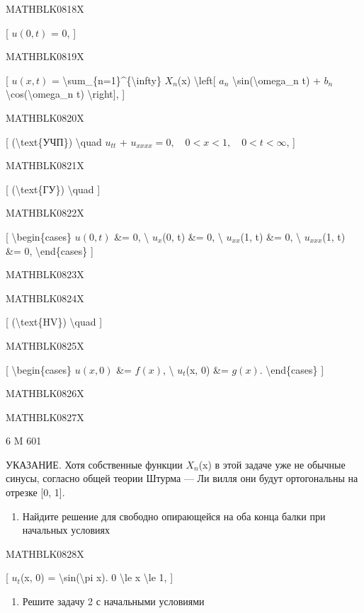 \documentclass[
]{article}
\providecommand{\tightlist}{%
  \setlength{\itemsep}{0pt}\setlength{\parskip}{0pt}}
\begin{document}
{{MATHBLK0818X

{[} \(u(0, t)\) = 0, {]}

MATHBLK0819X

{[} \(u(x, t)\) =
\textbackslash sum\_\{n=1\}\^{}\{\textbackslash infty\} \(X_n\)(x)
\textbackslash left{[} \(a_n\)
\textbackslash sin(\textbackslash omega\_n t) + \(b_n\)
\textbackslash cos(\textbackslash omega\_n t) \textbackslash right{]},
{]}

MATHBLK0820X

{[} (\textbackslash text\{УЧП\}) \textbackslash quad \(u_{tt}\) +
\(u_{xxxx} = 0, \quad 0 < x < 1, \quad 0 < t < \infty\), {]}

MATHBLK0821X

{[} (\textbackslash text\{ГУ\}) \textbackslash quad {]}

MATHBLK0822X

{[} \textbackslash begin\{cases\} \(u(0, t)\) \&= 0, \textbackslash{}
\(u_x\)(0, t) \&= 0, \textbackslash{} \(u_{xx}\)(1, t) \&= 0,
\textbackslash{} \(u_{xxx}\)(1, t) \&= 0, \textbackslash end\{cases\}
{]}

MATHBLK0823X

MATHBLK0824X

{[} (\textbackslash text\{HV\}) \textbackslash quad {]}

MATHBLK0825X

{[} \textbackslash begin\{cases\} \(u(x, 0)\) \&= \(f(x)\),
\textbackslash{} \(u_t\)(x, 0) \&= \(g(x)\). \textbackslash end\{cases\}
{]}

MATHBLK0826X

MATHBLK0827X

6 M 601

УКАЗАНИЕ. Хотя собственные функции \(X_n\)(x) в этой задаче уже не
обычные синусы, согласно общей теории Штурма --- Ли вилля они будут
ортогональны на отрезке {[}0, 1{]}.

\begin{enumerate}
\def\labelenumi{\arabic{enumi}.}
\setcounter{enumi}{1}
\tightlist
\item
  Найдите решение для свободно опирающейся на оба конца балки при
  начальных условиях
\end{enumerate}

MATHBLK0828X

{[} \(u_t\)(x, 0) = \textbackslash sin(\textbackslash pi x). 0
\textbackslash le x \textbackslash le 1, {]}

\begin{enumerate}
\def\labelenumi{\arabic{enumi}.}
\setcounter{enumi}{2}
\tightlist
\item
  Решите задачу 2 с начальными условиями
\end{enumerate}

}}
\end{document}

